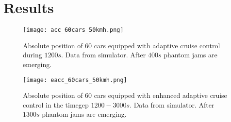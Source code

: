 \section{Results}

\begin{figure}[h!]
    \begin{center}
    \texttt{[image: acc\_60cars\_50kmh.png]}
    \caption{\label{acc_postime}
Absolute position of 60 cars equipped with adaptive cruise control during $ 1200 \unit{s} $. Data from simulator. After $ 400 \unit{s} $ phantom jams are emerging.}
    \end{center}
\end{figure}

\begin{figure}[h!]
    \begin{center}
    \texttt{[image: eacc\_60cars\_50kmh.png]}
    \caption{\label{eacc_postime}
Absolute position of 60 cars equipped with enhanced adaptive cruise control in the timegep $ 1200 - 3000 \unit{s} $. Data from simulator. After $ 1300 \unit{s} $ phantom jams are emerging.}
    \end{center}
\end{figure}